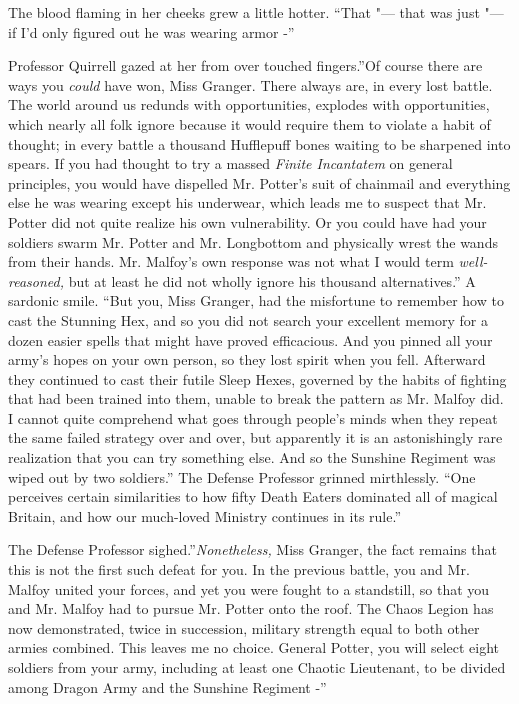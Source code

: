 The blood flaming in her cheeks grew a little hotter. ``That "--- that was
just "--- if I'd only figured out he was wearing armor -''

Professor Quirrell gazed at her from over touched fingers.''Of course
there are ways you \emph{could} have won, Miss Granger. There always
are, in every lost battle. The world around us redunds with
opportunities, explodes with opportunities, which nearly all folk ignore
because it would require them to violate a habit of thought; in every
battle a thousand Hufflepuff bones waiting to be sharpened into spears.
If you had thought to try a massed \emph{Finite Incantatem} on general
principles, you would have dispelled Mr. Potter's suit of chainmail and
everything else he was wearing except his underwear, which leads me to
suspect that Mr. Potter did not quite realize his own vulnerability. Or
you could have had your soldiers swarm Mr. Potter and Mr. Longbottom and
physically wrest the wands from their hands. Mr. Malfoy's own response
was not what I would term \emph{well-reasoned,} but at least he did not
wholly ignore his thousand alternatives.'' A sardonic smile. ``But you,
Miss Granger, had the misfortune to remember how to cast the Stunning
Hex, and so you did not search your excellent memory for a dozen easier
spells that might have proved efficacious. And you pinned all your
army's hopes on your own person, so they lost spirit when you fell.
Afterward they continued to cast their futile Sleep Hexes, governed by
the habits of fighting that had been trained into them, unable to break
the pattern as Mr. Malfoy did. I cannot quite comprehend what goes
through people's minds when they repeat the same failed strategy over
and over, but apparently it is an astonishingly rare realization that
you can try something else. And so the Sunshine Regiment was wiped out
by two soldiers.'' The Defense Professor grinned mirthlessly. ``One
perceives certain similarities to how fifty Death Eaters dominated all
of magical Britain, and how our much-loved Ministry continues in its
rule.''

The Defense Professor sighed.''\emph{Nonetheless,} Miss Granger, the
fact remains that this is not the first such defeat for you. In the
previous battle, you and Mr. Malfoy united your forces, and yet you were
fought to a standstill, so that you and Mr. Malfoy had to pursue Mr.
Potter onto the roof. The Chaos Legion has now demonstrated, twice in
succession, military strength equal to both other armies combined. This
leaves me no choice. General Potter, you will select eight soldiers from
your army, including at least one Chaotic Lieutenant, to be divided
among Dragon Army and the Sunshine Regiment -''


